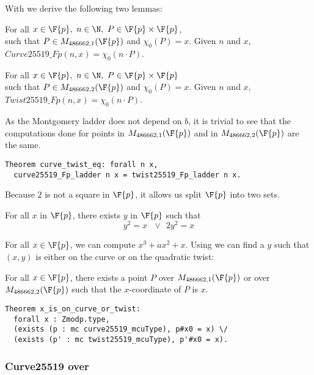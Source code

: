 With  we derive the following two lemmas:
\begin{lemma}
For all $x \in \F{p},\ n \in \N,\ P \in \F{p} \times \F{p}$,\\
such that $P \in M_{486662,1}(\F{p})$ and $\chi_0(P) = x$.
Given $n$ and $x$, $Curve25519\_Fp(n,x) = \chi_0(n \cdot P)$.
\end{lemma}
\begin{lemma}
For all $x \in \F{p},\ n \in \N,\ P \in \F{p} \times \F{p}$\\
such that $P \in M_{486662,2}(\F{p})$ and $\chi_0(P) = x$.
Given $n$ and $x$, $Twist25519\_Fp(n,x) = \chi_0(n \cdot P)$.
\end{lemma}
As the Montgomery ladder does not depend on $b$, it is trivial to
see that the computations done for points in $M_{486662,1}(\F{p})$ and in
$M_{486662,2}(\F{p})$ are the same.
\begin{lstlisting}[language=Coq]
Theorem curve_twist_eq: forall n x,
  curve25519_Fp_ladder n x = twist25519_Fp_ladder n x.
\end{lstlisting}

Because $2$ is not a square in $\F{p}$, it allows us split $\F{p}$ into two sets.
\begin{lemma}
  \label{lemma:square-or-2square}
  For all $x$ in $\F{p}$, there exists $y$ in $\F{p}$ such that
  $$y^2 = x\ \ \ \lor\ \ 2y^2 = x$$
\end{lemma}
For all $x \in \F{p}$, we can compute $x^3 + ax^2 + x$. Using 
we can find a $y$ such that $(x,y)$ is either on the curve or on the quadratic twist:
\begin{lemma}
  \label{lemma:curve-or-twist}
  For all $x \in \F{p}$, there exists a point $P$ over $M_{486662,1}(\F{p})$ or
  over $M_{486662,2}(\F{p})$ such that the $x$-coordinate of $P$ is $x$.
\end{lemma}
\begin{lstlisting}[language=Coq]
Theorem x_is_on_curve_or_twist:
  forall x : Zmodp.type,
  (exists (p : mc curve25519_mcuType), p#x0 = x) \/
  (exists (p' : mc twist25519_mcuType), p'#x0 = x).
\end{lstlisting}

\subsubsection{Curve25519 over }

